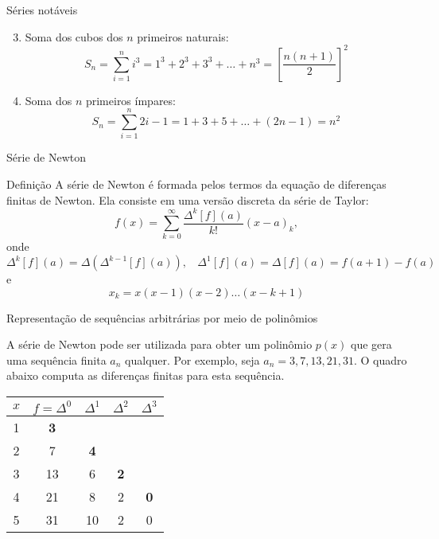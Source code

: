 \begin{frame}[fragile]{Séries notáveis}

    \begin{enumerate}
        \setcounter{enumi}{2}
        \item Soma dos cubos dos $n$ primeiros naturais:
$$
    S_n = \sum_{i = 1}^n i^3 = 1^3 + 2^3 + 3^3 + \ldots + n^3 = \left[\frac{n(n + 1)}{2}\right]^2
$$

        \item Soma dos $n$ primeiros ímpares:
$$
    S_n = \sum_{i = 1}^n  2i - 1 = 1 + 3 + 5 + \ldots + (2n - 1) = n^2
$$
    \end{enumerate}

\end{frame}

\begin{frame}[fragile]{Série de Newton}

    \begin{block}{Definição}
        A série de Newton é formada pelos termos da equação de diferenças finitas de Newton. Ela consiste em uma versão discreta da série de Taylor:
        $$
            f(x) = \sum_{k = 0}^\infty \frac{\Delta^k[f](a)}{k!}(x - a)_k,
        $$
        onde
        $$
            \Delta^k[f](a) = \Delta(\Delta^{k - 1}[f](a)), \ \ \ \ \Delta^1[f](a) = \Delta[f](a) = f(a + 1) - f(a)
        $$
        e
        $$
            x_k = x(x - 1)(x - 2)\ldots (x - k + 1)
        $$
    \end{block}

\end{frame}

\begin{frame}[fragile]{Representação de sequências arbitrárias por meio de polinômios}

A série de Newton pode ser utilizada para obter um polinômio $p(x)$ que gera uma sequência finita $a_n$ qualquer. Por exemplo, seja $a_n = 3, 7, 13, 21, 31$. O quadro abaixo computa as diferenças finitas para esta sequência.

\begin{table}[h]
    \centering

    \begin{tabular}{ccccc}
    \toprule
        $x$ & $f = \Delta^0$ & $\Delta^1$ & $\Delta^2$ & $\Delta^3$ \\
    \midrule
         1 & \textbf{3} \\
         2 & 7 & \textbf{4}\\
         3 & 13 & 6 & \textbf{2} \\
         4 & 21 & 8 & 2 & \textbf{0}\\
         5 & 31 & 10 & 2 & 0 \\
    \bottomrule
    \end{tabular}
\end{table}

\end{frame}

